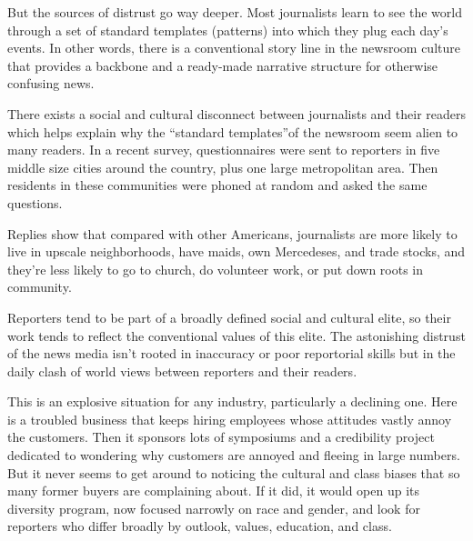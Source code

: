 But the sources of distrust go way deeper. Most journalists learn to see
the world through a set of standard templates (patterns) into which they
plug each day's events. In other words, there is a conventional story
line in the newsroom culture that provides a backbone and a ready-made
narrative structure for otherwise confusing news.

There exists a social and cultural disconnect between journalists and
their readers which helps explain why the ``standard templates''of the
newsroom seem alien to many readers. In a recent survey, questionnaires
were sent to reporters in five middle size cities around the country,
plus one large metropolitan area. Then residents in these communities
were phoned at random and asked the same questions.

Replies show that compared with other Americans, journalists are more
likely to live in upscale neighborhoods, have maids, own Mercedeses, and
trade stocks, and they're less likely to go to church, do volunteer
work, or put down roots in community.

Reporters tend to be part of a broadly defined social and cultural
elite, so their work tends to reflect the conventional values of this
elite. The astonishing distrust of the news media isn't rooted in
inaccuracy or poor reportorial skills but in the daily clash of world
views between reporters and their readers.

This is an explosive situation for any industry, particularly a
declining one. Here is a troubled business that keeps hiring employees
whose attitudes vastly annoy the customers. Then it sponsors lots of
symposiums and a credibility project dedicated to wondering why
customers are annoyed and fleeing in large numbers. But it never seems
to get around to noticing the cultural and class biases that so many
former buyers are complaining about. If it did, it would open up its
diversity program, now focused narrowly on race and gender, and look for
reporters who differ broadly by outlook, values, education, and class.


